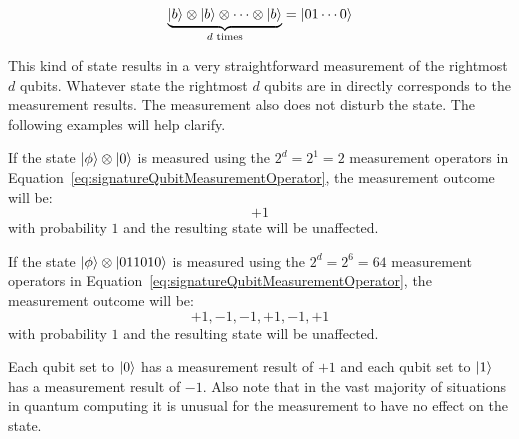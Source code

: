 \begin{align}
\underbrace{\ket{b} \otimes \ket{b} \otimes \cdots \otimes \ket{b}}_{d \text{ times}} = \ket{01 \cdots 0}
\end{align}

This kind of state results in a very straightforward measurement of the rightmost $d$ qubits. Whatever state the rightmost $d$ qubits are in directly corresponds to the measurement results. The measurement also does not disturb the state.  The following examples will help clarify.
\begin{example}
If the state $\ket{\phi} \otimes \ket{0}$ is measured using the $2^d = 2^1 = 2$ measurement operators in Equation~\eqref{eq:signatureQubitMeasurementOperator}, the measurement outcome will be:
$$+1$$
with probability $1$ and the resulting state will be unaffected.
\end{example}
\begin{example}
If the state $\ket{\phi} \otimes \ket{011010}$ is measured using the $2^d = 2^6 = 64$ measurement operators in Equation~\eqref{eq:signatureQubitMeasurementOperator}, the measurement outcome will be:
$$+1,-1,-1,+1,-1,+1$$
with probability $1$ and the resulting state will be unaffected.
\end{example}
Each qubit set to $\ket{0}$ has a measurement result of $+1$ and each qubit set to $\ket{1}$ has a measurement result of $-1$. Also note that in the vast majority of situations in quantum computing it is unusual for the measurement to have no effect on the state.

